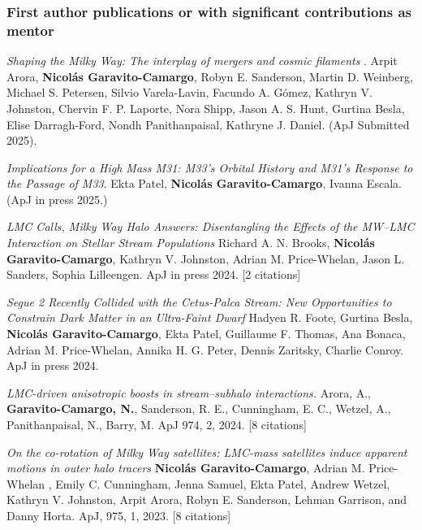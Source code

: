 \documentclass[14pt]{article}
\begin{document}
\subsubsection*{First author publications or with significant contributions as mentor}


\begin{etaremune}
  \setcounter{enumi}{34}
\item \dag \textit{Shaping the Milky Way: The interplay of mergers and cosmic
  filaments }.
  Arpit Arora, \textbf{Nicol\'as
  Garavito-Camargo},  Robyn E. Sanderson, Martin D. Weinberg, Michael S. Petersen, Silvio Varela-Lavin, Facundo A. Gómez, Kathryn V. Johnston, Chervin F. P. Laporte, Nora Shipp, Jason A. S. Hunt, Gurtina Besla, Elise Darragh-Ford, Nondh Panithanpaisal, Kathryne J. Daniel. (ApJ Submitted 2025).

\item \textit{Implications for a High Mass M31: M33’s Orbital History and M31’s
  Response to the Passage of M33}. Ekta Patel, \textbf{Nicol\'as
  Garavito-Camargo}, Ivanna Escala. (ApJ in press 2025.)

\item \dag \textit{LMC Calls, Milky Way Halo Answers: Disentangling the Effects of
  the MW--LMC Interaction on Stellar Stream Populations}  Richard A. N.
  Brooks, \textbf{Nicol\'as Garavito-Camargo}, Kathryn V. Johnston, Adrian M. Price-Whelan,
  Jason L. Sanders, Sophia Lilleengen. ApJ in press 2024. [2 citations]

\item \ddag \textit{Segue 2 Recently Collided with the Cetus-Palca Stream: New
    Opportunities to Constrain Dark Matter in an Ultra-Faint Dwarf} Hadyen R.
    Foote, Gurtina Besla, \textbf{Nicol\'as Garavito-Camargo}, Ekta Patel, Guillaume F.
    Thomas, Ana Bonaca, Adrian M. Price-Whelan, Annika H. G. Peter, Dennis
    Zaritsky, Charlie Conroy. ApJ in press 2024. 

\item \dag \textit{LMC-driven anisotropic boosts in stream–subhalo
  interactions.} Arora, A., \textbf{Garavito-Camargo, N.}, Sanderson, R. E.,
  Cunningham, E. C., Wetzel, A., Panithanpaisal, N., Barry, M. ApJ 974, 2, 2024.
  [8 citations]

\item \textit{On the co-rotation of Milky Way satellites: LMC-mass satellites induce apparent motions in outer halo tracers}  
  \textbf{Nicol\'as Garavito-Camargo}, Adrian M. Price-Whelan , Emily C. Cunningham, Jenna
Samuel, Ekta Patel, Andrew Wetzel, Kathryn V. Johnston, Arpit Arora, Robyn E.
Sanderson, Lehman Garrison, and Danny Horta. ApJ, 975, 1, 2023. [8 citations] 


\end{etaremune}
\end{document}
